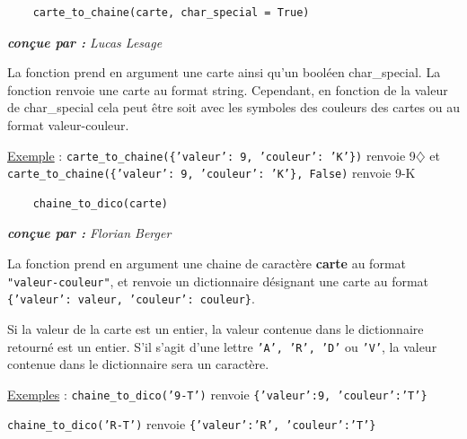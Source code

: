 \documentclass[titlepage]{article}
\begin{document}
\label{fun : carte_to_chaine}
\noindent	\begin{minipage}{\textwidth}
	\begin{lstlisting}
	carte_to_chaine(carte, char_special = True)
	\end{lstlisting}
	\end{minipage}
	
\emph{\textbf{conçue par : } Lucas Lesage} \vspace{2mm}\par

La fonction prend en argument une carte ainsi qu’un booléen char\_special. La fonction renvoie une carte au format string. Cependant, en fonction de la valeur de char\_special cela peut être soit avec les symboles des couleurs des cartes ou au format valeur-couleur.\vspace{1mm}\par
\underline{Exemple} : \texttt{carte\_to\_chaine(\{'valeur': 9, 'couleur': 'K'\})} renvoie 9$\diamondsuit$ et \texttt{carte\_to\_chaine(\{'valeur': 9, 'couleur': 'K'\}, False)} renvoie 9-K \par
\vspace{5mm}
	
\noindent	\begin{minipage}{\textwidth}
	\begin{lstlisting}
	chaine_to_dico(carte)
	\end{lstlisting}
	\end{minipage}
	
\emph{\textbf{conçue par : } Florian Berger} \vspace{2mm}\par
La fonction prend en argument une chaine de caractère \textbf{carte} au format \texttt{"valeur-couleur"}, et renvoie un dictionnaire désignant une carte au format \texttt{\{'valeur': valeur, 'couleur': couleur\}}.\par
Si la valeur de la carte est un entier, la valeur contenue dans le dictionnaire retourné est un entier. S'il s'agit d'une lettre \texttt{'A', 'R', 'D'} ou \texttt{'V'}, la valeur contenue dans le dictionnaire sera un caractère.\vspace{1mm}\par
\underline{Exemples} : \texttt{chaine\_to\_dico('9-T')} renvoie \texttt{\{'valeur':9, 'couleur':'T'\}}\par
\hspace*{1.75cm}\texttt{chaine\_to\_dico('R-T')} renvoie \texttt{\{'valeur':'R', 'couleur':'T'\}}\par
\vspace{5mm}
\end{document}
